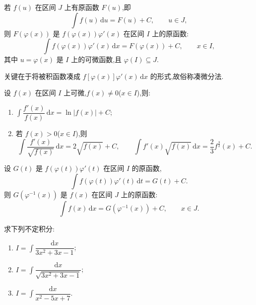 \begin{theorem}[第一积分换元法]
    若 $f(u)$ 在区间 $J$ 上有原函数 $F(u)$,即
    \[
        \displaystyle\int f(u)\,\mathrm{d}u=F(u)+C,
        \qquad u\in J,
    \]
    则 $F(\varphi(x))$ 是 $f(\varphi(x))\varphi'(x)$ 在区间 $I$ 上的原函数:
    \[
        \displaystyle\int f(\varphi(x))\varphi'(x)\,\mathrm{d}x
        =F(\varphi(x))+C,
        \qquad x\in I,
    \]
    其中 $u=\varphi(x)$ 是 $I$ 上的可微函数,且 $\varphi(I)\subseteq J$.
\end{theorem}

\begin{remark}
    关键在于将被积函数凑成 $f[\varphi(x)]\varphi'(x)\,\mathrm{d}x$ 的形式,故俗称凑微分法.
\end{remark}

\begin{corollary}[\markstar]
    设 $f(x)$ 在区间 $I$ 上可微,$f(x)\neq0$($x\in I$),则:
    \begin{enumerate}
        \item $\displaystyle\int\dfrac{f'(x)}{f(x)}\,\mathrm{d}x=\ln|f(x)|+C$;
        \item 若 $f(x)>0$($x\in I$),则
              \[
                  \displaystyle\int\dfrac{f'(x)}{\sqrt{f(x)}}\,\mathrm{d}x=2\sqrt{f(x)}+C,
                  \qquad
                  \int f'(x)\sqrt{f(x)}\,\mathrm{d}x
                  =\dfrac{2}{3}f^{\frac{3}{2}}(x)+C.
              \]
    \end{enumerate}
\end{corollary}

\begin{theorem}[第二积分换元法]
    设 $G(t)$ 是 $f(\varphi(t))\varphi'(t)$ 在区间 $I$ 的原函数,
    \[
        \displaystyle\int f(\varphi(t))\varphi'(t)\,\mathrm{d}t=G(t)+C.
    \]
    则 $G(\varphi^{-1}(x))$ 是 $f(x)$ 在区间 $J$ 上的原函数:
    \[
        \displaystyle\int f(x)\,\mathrm{d}x=G(\varphi^{-1}(x))+C,
        \qquad x\in J.
    \]
\end{theorem}

\begin{example}
    求下列不定积分:
    \begin{enumerate}
        \item $\displaystyle I=\int\dfrac{\mathrm{d}x}{3x^2+3x-1}$;
        \item $\displaystyle I=\int\dfrac{\mathrm{d}x}{\sqrt{3x^2+3x-1}}$;
        \item $\displaystyle I=\int\dfrac{\mathrm{d}x}{x^2-5x+7}$.
    \end{enumerate}
\end{example}
\exampleblank

